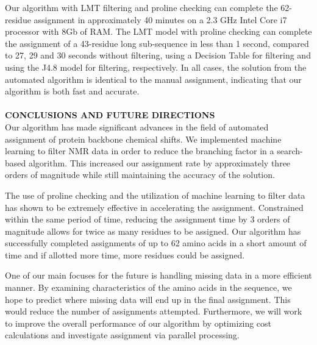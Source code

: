 \documentclass{article}
\begin{document}
\indent Our algorithm with LMT filtering and proline checking can complete the 62-residue assignment in approximately 40 minutes on a 2.3 GHz Intel Core i7 processor with 8Gb of RAM. The LMT model with proline checking can complete the assignment of a 43-residue long sub-sequence in less than 1 second, compared to 27, 29 and 30 seconds without filtering, using a Decision Table for filtering and using the J4.8 model for filtering, respectively. In all cases, the solution from the automated algorithm is identical to the manual assignment, indicating that our algorithm is both fast and accurate. 
\\\\
\noindent\textbf {CONCLUSIONS AND FUTURE DIRECTIONS}\\
\indent Our algorithm has made significant advances in the field of automated assignment of protein backbone chemical shifts. We implemented machine learning to filter NMR data in order to reduce the branching factor in a search-based algorithm. This increased our assignment rate by approximately three orders of magnitude while still maintaining the accuracy of the solution.

\indent The use of proline checking and the utilization of machine learning to filter data has shown to be extremely effective in accelerating the assignment. Constrained within the same period of time, reducing the assignment time by 3 orders of magnitude allows for twice as many residues to be assigned. Our algorithm has successfully completed assignments of up to 62 amino acids in a short amount of time and if allotted more time, more residues could be assigned.

\indent One of our main focuses for the future is handling missing data in a more efficient manner. By examining characteristics of the amino acids in the sequence, we hope to predict where missing data will end up in the final assignment. This would reduce the number of assignments attempted. Furthermore, we will work to improve the overall performance of our algorithm by optimizing cost calculations and investigate assignment via parallel processing.
\end{document}
